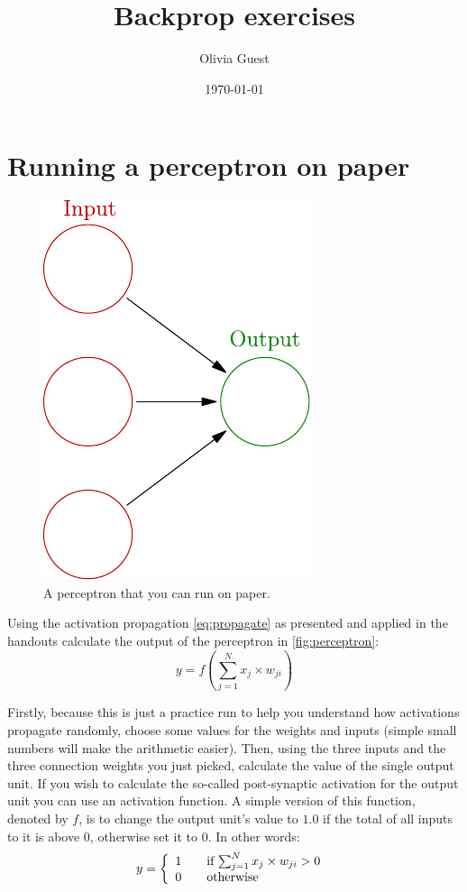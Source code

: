 \documentclass[a4paper,10pt]{article}
\title{Backprop exercises}
\author{Olivia Guest}
\date{\today}
\begin{document}
\maketitle
\section{Running a perceptron on paper}
\begin{figure}[hb]
 \centering
 \includegraphics{../slides/fig/perceptron_empty.pdf}
 \caption{A perceptron that you can run on paper.}
 \label{fig:perceptron}
\end{figure}
Using the activation propagation \autoref{eq:propagate} as presented and applied in the handouts calculate the output of the perceptron in \autoref{fig:perceptron}:
\begin{equation}
\label{eq:propagate}
y = f\left(  \sum_{j=1}^N x_j \times w_{ji} \right)
\end{equation}

Firstly, because this is just a practice run to help you understand how activations propagate randomly, choose some values for the weights and inputs (simple small numbers will make the arithmetic easier). Then, using the three inputs and the three connection weights you just picked, calculate the value of the single output unit. If you wish to calculate the so-called post-synaptic activation for the output unit you can use an activation function. A simple version of this function, denoted by $f$, is to change the output unit's value to $1.0$ if the total of all inputs to it is above $0$, otherwise set it to $0$. In other words:
\begin{equation}
\label{eq:f}
  y = \left\{ 
  \begin{array}{l l}
    1 & \quad \text{if $ \sum_{j=1}^N x_j \times w_{ji} > 0$ }\\
    0 & \quad \text{otherwise}\\
  \end{array} \right.
\end{equation}
\end{document}
